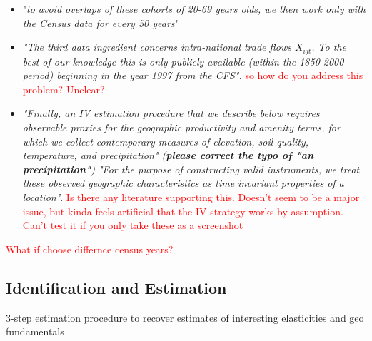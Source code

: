 \documentclass[12pt, final]{article}
\begin{document}
\begin{itemize}
    \item "\textit{to avoid overlaps of these cohorts of 20-69 years olds, we then work only with the Census data for every 50 years}"
    \item \textit{"The third data ingredient concerns intra-national trade flows $X_{ijt}$. To the best of our knowledge this is only publicly available (within the 1850-2000 period) beginning in the year 1997 from the CFS".} \textcolor{red}{so how do you address this problem? Unclear?}
    \item \textit{"Finally, an IV estimation procedure that we describe below requires observable proxies for the geographic productivity and amenity terms, for which we collect contemporary measures of elevation, soil quality, temperature, and precipitation" (\textbf{please correct the typo of "an precipitation"}) "For the purpose of constructing valid instruments, we treat these observed geographic characteristics as time invariant properties of a location"}. \textcolor{red}{Is there any literature supporting this. Doesn't seem to be a major issue, but kinda feels artificial that the IV strategy works by assumption. Can't test it if you only take these as a screenshot}
\end{itemize}
\textcolor{red}{What if choose differnce census years?}

\subsection{Identification and Estimation} %
\label{sub:identification_and_estimation}

3-step estimation procedure to recover estimates of interesting elasticities and geo fundamentals
\end{document}
